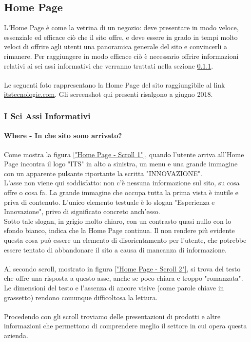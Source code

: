 \subsection{Home Page}
L'Home Page è come la vetrina di un negozio: deve presentare in modo veloce, essenziale ed efficace ciò che il sito offre, e deve essere in grado in tempi molto veloci di offrire agli utenti una panoramica generale del sito e convincerli a rimanere. 
Per raggiungere in modo efficace ciò è necessario offrire informazioni relativi ai sei assi informativi che verranno trattati nella sezione \ref{6w}.\\
 \\
Le seguenti foto rappresentano la Home Page del sito raggiungibile al link \url{itstecnologie.com}. Gli screenshot qui presenti risalgono a giugno 2018.

\subsubsection{I Sei Assi Informativi}\label{6w}

\paragraph{Where - In che sito sono arrivato?}
Come mostra la figura \ref{"Home Page - Scroll 1"}, quando l'utente arriva all'Home Page incontra il logo "ITS" in alto a sinistra, un menu e una grande immagine con un apparente pulsante riportante la scritta "INNOVAZIONE". \\
L'asse non viene qui soddisfatto: non c'è nessuna informazione sul sito, su cosa offre o cosa fa. La grande immagine che occupa tutta la prima vista è inutile e priva di contenuto. L'unico elemento testuale è lo slogan "Esperienza e Innovazione", privo di significato concreto anch'esso. \\
Sotto tale slogan, in grigio molto chiaro, con un contrasto quasi nullo con lo sfondo bianco, indica che la Home Page continua. Il non rendere più evidente questa cosa può essere un elemento di disorientamento per l'utente, che potrebbe essere tentato di abbandonare il sito a causa di mancanza di informazione.\\ \\
Al secondo scroll, mostrato in figura \ref{"Home Page - Scroll 2"}, si trova del testo che offre una risposta a questo asse, anche se poco chiara e troppo "romanzata". Le dimensioni del testo e l'assenza di ancore visive (come parole chiave in grassetto) rendono comunque difficoltosa la lettura. \\
\\
Procedendo con gli scroll troviamo delle presentazioni di prodotti e altre informazioni che permettono di comprendere meglio il settore in cui opera questa azienda.
